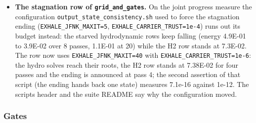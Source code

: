 \documentclass[english,a4paper]{my_memo}
\begin{document}
\begin{itemize}
  on from the composition the step restored and the refusals are counted
  (the final report prints "element steps refused inside the initialization
  march: n"). A test knob, \texttt{element\_refuse\_leading\_steps\_for\_test}
  (\texttt{EXHALE\_ELEMENT\_REFUSE\_STEPS}, zero in every production run), refuses the
  first n element steps so the path can be exercised: on \texttt{mol\_diffusion} in
  phys mode with two refusals injected, attempt 1 at dt 1.47451E-04 and
  attempt 2 at 7.37253E-05 are refused "at the element diffusion step: an
  element invariant broke" and attempt 3 runs at 3.68626E-05; in init mode
  the two refusals are counted and the run exits 0. (The phys-mode run of
  that fixture then fails at step 0 on the coupled source step\textquotesingle s fixed point
  with or without the knob, exit 2: a property of that fixed-step snapshot in
  phys mode, not of Q4.) Found beside it and fixed: the refusal census of
  \texttt{attempted\_step\_note\_step} stopped one reason short
  (\texttt{as\_reject\_source\_fixed\_point}), so a source-energy refusal was never
  counted by reason; the bound is now \texttt{as\_reject\_source\_energy}.
\item
  \textbf{The stagnation row of \texttt{grid\_and\_gates}.} On the joint progress measure
  the configuration \texttt{output\_state\_consistency.sh} used to force the
  stagnation ending (\texttt{EXHALE\_JFNK\_MAXIT=5}, \texttt{EXHALE\_CARRIER\_TRUST=1e-4}) runs
  out its budget instead: the starved hydrodynamic rows keep falling (energy
  4.9E-01 to 3.9E-02 over 8 passes, 1.1E-01 at 20) while the H2 row stands at
  7.3E-02. The row now uses \texttt{EXHALE\_JFNK\_MAXIT=40} with
  \texttt{EXHALE\_CARRIER\_TRUST=1e-6}: the hydro solves reach their roots, the H2
  row stands at 7.38E-02 for four passes and the ending is announced at pass
  4; the second assertion of that script (the ending hands back one state)
  measures 7.1e-16 against 1e-12. The script\textquotesingle s header and the suite README
  say why the configuration moved.
\end{itemize}

\subsubsection{Gates}\label{gates-1}
\end{document}
